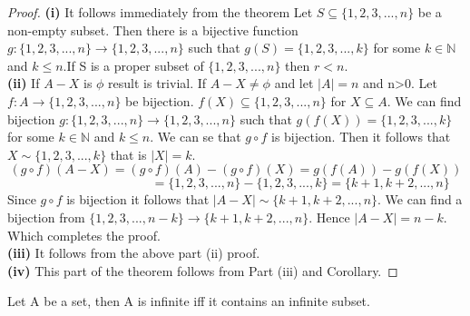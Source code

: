 \documentclass[a4paper,english,12pt]{article}   	%
\begin{document}
\begin{proof}
\textbf{(i)} It follows immediately from the theorem Let $S \subseteq \{1,2,3,...,n\}$  be a non-empty subset. Then there is a bijective function $g \colon \{1,2,3,...,n\} \to \{1,2,3,...,n\}$ such that $g(S) =  \{1,2,3,...,k\}$ for some $k \in \mathbb{N}$ and $k \leq n$.If S is a proper subset of $\{1,2,3,...,n\}$ then $r < n$.\\
\textbf{(ii)} If $A - X$ is $\phi$ result is trivial. If $A - X \neq \phi$ and let $|A|=n$ and n>0. Let $f \colon A \to \{1,2,3,...,n\}$ be bijection. $f(X) \subseteq \{1,2,3,...,n\}$ for $X \subseteq A$. We can find bijection $g \colon \{1,2,3,...,n\} \to \{1,2,3,...,n\}$ such that $g(f(X)) =  \{1,2,3,...,k\}$ for some $k \in \mathbb{N}$ and $k \leq n$. We can se that $g \circ f$ is bijection. Then it follows that $X \sim  \{1,2,3,...,k\}$ that is $|X|=k$.\\
\[ (g \circ f)(A-X)=(g \circ f)(A)-(g \circ f)(X)= g(f(A))-g(f(X))\]
$\qquad \qquad \qquad \qquad \qquad \,\,\,\,\,\,\,\,   =\{1,2,3,...,n\}-\{1,2,3,...,k\} = \{k+1,k+2,...,n\}$\\
Since $g \circ f$ is bijection it follows that $|A-X| \sim \{k+1,k+2,...,n\}$. We can find a bijection from $\{1,2,3,...,n-k\} \to \{k+1,k+2,...,n\}$. Hence $|A-X|=n-k$.
Which completes the proof.\\
\textbf{(iii)} It follows from the above part (ii) proof.\\
\textbf{(iv)} This part of the theorem follows from Part (iii) and Corollary.

\end{proof}
\begin{cor} Let A be a set, then A is infinite iff it contains an infinite subset.
\end{cor}
\end{document}
